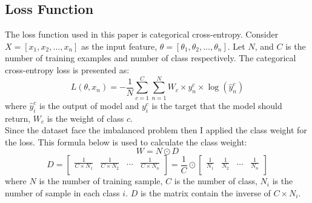 \subsection{Loss Function}
The loss function used in this paper is categorical cross-entropy. Consider $X = [x_1, x_2, \dots, x_n]$ as the input feature, $\theta = [\theta_1, \theta_2, \dots, \theta_n]$. Let $N$, and $C$ is the number of training examples and number of class respectively. The categorical cross-entropy loss is presented as:
\[L(\theta, x_n) = -\frac{1}{N}\sum_{c=1}^{C}\sum_{n=1}^{N}W_c\times y^c_n \times \log(\hat{y}^c_n)\]
where $\hat{y}^c_i$  is the output of model and $y^c_i$ is the target that the model should return, $W_c$ is the weight of class $c$.\\
Since the dataset face the imbalanced problem then I applied the class weight for the loss. This formula below is used to calculate the class weight:
\[W = N \odot D\]
\[D = \begin{bmatrix}
	\frac{1}{C \times  N_1} & \frac{1}{C \times  N_2} & \dots & \frac{1}{C \times  N_n}\\
\end{bmatrix} = \frac{1}{C} \odot \begin{bmatrix}
\frac{1}{N_1} & \frac{1}{N_2} & \dots & \frac{1}{N_n}\\
\end{bmatrix}\]
where $N$ is the number of training sample, $C$ is the number of class, $N_i$ is the number of sample in each class $i$. $D$ is the matrix contain the inverse of $C \times N_i$. 
